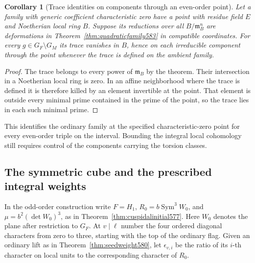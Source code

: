 \documentclass[a4paper,11pt]{article}
\newtheorem{corollary}[proposition]{Corollary}
\theoremstyle{definition}
\theoremstyle{remark}
\numberwithin{equation}{section}
\begin{document}
\begin{corollary}[Trace identities on components through an even-order point]
\leavevmode\label{cor:quadraticcomponent583}
Let a family with generic coefficient characteristic zero have a
point with residue field \(E\) and Noetherian local ring \(B\).
Suppose its reductions over all \(B/\mathfrak m_B^n\) are
deformations in Theorem~\ref{thm:quadraticfamily583} in compatible
coordinates. For every \(g\in G_F\setminus G_M\) its trace
vanishes in \(B\), hence on each irreducible component through
the point whenever the trace is defined on the ambient family.
\end{corollary}
\begin{proof}
The trace belongs to every power of \(\mathfrak m_B\) by the
theorem. Their intersection in a Noetherian local ring is zero.
In an affine neighborhood where the trace is defined it is
therefore killed by an element invertible at the point.
That element is outside every minimal prime contained in the
prime of the point, so the trace lies in each such minimal prime.
\end{proof}

This identifies the ordinary family at the specified
characteristic-zero point for every even-order triple on the
interval. Bounding the integral local cohomology still requires
control of the components carrying the torsion classes.


\subsection{The symmetric cube and the prescribed integral weights}
\label{sec:cubeweights584}

In the odd-order construction write \(F=H_1\), \(R_0=b\operatorname{Sym}^3 W_0\),
and \(\mu=b^2(\det W_0)^3\), as in Theorem~\ref{thm:cuspidalinitial577}.
Here \(W_0\) denotes the plane after restriction to \(G_F\).
At \(v\mid\ell\) number the four ordered diagonal characters from
zero to three, starting with the top of the ordinary flag.
Given an ordinary lift as in Theorem~\ref{thm:seedweight580},
let \(\epsilon_{v,i}\) be the ratio of its \(i\)-th character on
local units to the corresponding character of \(R_0\).
\end{document}

